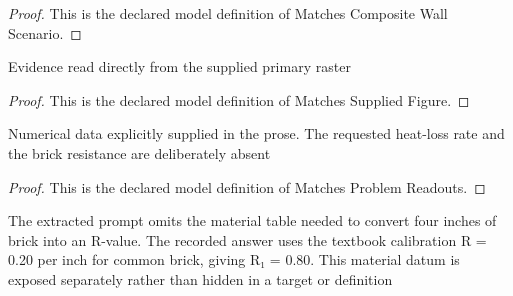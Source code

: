 \begin{proof}
  This is the declared model definition of Matches Composite Wall Scenario.
\end{proof}
\begin{definition}
  \label{def:physics:phyx-mini-0487:phyxminiproblems-problemphyxmini0487-matchessuppliedfigure}
  Evidence read directly from the supplied primary raster
\end{definition}
\begin{proof}
  This is the declared model definition of Matches Supplied Figure.
\end{proof}
\begin{definition}
  \label{def:physics:phyx-mini-0487:phyxminiproblems-problemphyxmini0487-matchesproblemreadouts}
  Numerical data explicitly supplied in the prose. The requested heat-loss rate and the brick resistance are deliberately absent
\end{definition}
\begin{proof}
  This is the declared model definition of Matches Problem Readouts.
\end{proof}
\begin{definition}
  \label{def:physics:phyx-mini-0487:phyxminiproblems-problemphyxmini0487-usestextbookfourinchbrickresistance}
  The extracted prompt omits the material table needed to convert four inches of brick into an R-value. The recorded answer uses the textbook calibration R = 0.20 per inch for common brick, giving R₁ = 0.80. This material datum is exposed separately rather than hidden in a target or definition
\end{definition}
